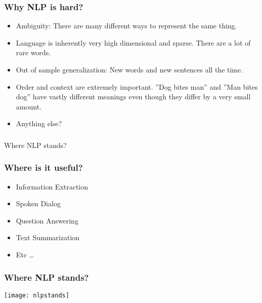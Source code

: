 \begin{frame}[fragile]\frametitle{Why NLP is hard?}
  \begin{itemize}
    \item  Ambiguity: There are many different ways to represent the same thing.
\item Language is inherently very high dimensional and sparse. There are a lot of rare words.
\item Out of sample generalization: New words and new sentences all the time.
\item Order and context are extremely important. ''Dog bites man'' and ''Man bites dog'' have vastly different meanings even though they differ by a very small amount.
\item Anything else?
  \end{itemize}

\end{frame}
 
 
\begin{frame}[fragile]\frametitle{}

\begin{center}
{\Large Where NLP stands?}
\end{center}
\end{frame}



\begin{frame}[fragile]\frametitle{Where is it useful?}
  \begin{itemize}
    \item Information Extraction
    \item Spoken Dialog
    \item Question Answering
    \item Text Summarization
	\item Etc \ldots
  \end{itemize}
\end{frame}

\begin{frame}[fragile]\frametitle{Where NLP stands?}
\begin{center}
\texttt{[image: nlpstands]}
\end{center}
\end{frame}



